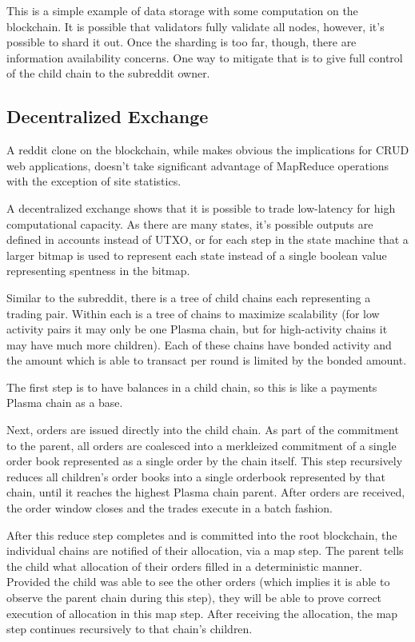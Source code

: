 \documentclass[letterpaper, 11pt]{article}
\begin{document}
This is a simple example of data storage with some computation on the
blockchain. It is possible that validators fully validate all nodes, however,
it's possible to shard it out. Once the sharding is too far, though, there are
information availability concerns. One way to mitigate that is to give full
control of the child chain to the subreddit owner.

\subsection{Decentralized Exchange}

A reddit clone on the blockchain, while makes obvious the implications for CRUD
web applications, doesn't take significant advantage of MapReduce operations
with the exception of site statistics.

A decentralized exchange shows that it is possible to trade low-latency for high
computational capacity. As there are many states, it's possible outputs are
defined in accounts instead of UTXO, or for each step in the state machine that
a larger bitmap is used to represent each state instead of a single boolean
value representing spentness in the bitmap.

Similar to the subreddit, there is a tree of child chains each representing a
trading pair. Within each is a tree of chains to maximize scalability (for low
activity pairs it may only be one Plasma chain, but for high-activity chains it
may have much more children). Each of these chains have bonded activity and the
amount which is able to transact per round is limited by the bonded amount.

The first step is to have balances in a child chain, so this is like a payments
Plasma chain as a base.

Next, orders are issued directly into the child chain. As part of the commitment
to the parent, all orders are coalesced into a merkleized commitment of a single
order book represented as a single order by the chain itself. This step
recursively reduces all children's order books into a single orderbook
represented by that chain, until it reaches the highest Plasma chain parent.
After orders are received, the order window closes and the trades execute in a
batch fashion.

After this reduce step completes and is committed into the root blockchain, the
individual chains are notified of their allocation, via a map step. The parent
tells the child what allocation of their orders filled in a deterministic
manner. Provided the child was able to see the other orders (which implies it is
able to observe the parent chain during this step), they will be able to prove
correct execution of allocation in this map step. After receiving the
allocation, the map step continues recursively to that chain's children.
\end{document}

